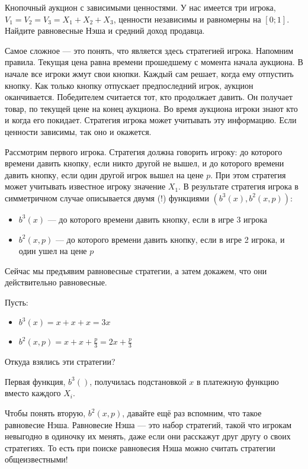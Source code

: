 \begin{myex} Кнопочный аукцион с зависимыми ценностями.
У нас имеется три игрока, $ V_{1}=V_{2}=V_{3}=X_{1}+X_{2}+X_{3} $, ценности независимы и равномерны на $ [0;1] $. Найдите равновесные Нэша и средний доход продавца.

Самое сложное — это понять, что является здесь стратегией игрока. Напомним правила. Текущая цена равна времени прошедшему с момента начала аукциона. В начале все игроки жмут свои кнопки. Каждый сам решает, когда ему отпустить кнопку. Как только кнопку отпускает предпоследний игрок, аукцион оканчивается. Победителем считается тот, кто продолжает давить. Он получает товар, по текущей цене на конец аукциона. Во время аукциона игроки знают кто и когда его покидает. Стратегия игрока может учитывать эту информацию. Если ценности зависимы, так оно и окажется.

Рассмотрим первого игрока. Стратегия должна говорить игроку: до которого времени давить кнопку, если никто другой не вышел, и до которого времени давить кнопку, если один другой игрок вышел на цене $ p $. При этом стратегия может учитывать известное игроку значение $ X_{1} $. В результате стратегия игрока в симметричном случае описывается двумя (!) функциями $ (b^{3}(x), b^{2}(x,p)) $:
\begin{itemize}
\item $ b^{3}(x) $ — до которого времени давить кнопку, если в игре 3 игрока
\item $ b^{2}(x,p) $ — до которого времени давить кнопку, если в игре 2 игрока, и один ушел на цене $ p $
\end{itemize}


Сейчас мы предъявим равновесные стратегии, а затем докажем, что они действительно равновесные.

Пусть:
\begin{itemize}
\item $ b^{3}(x)=x+x+x=3x$
\item $ b^{2}(x,p)=x+x+\frac{p}{3}=2x+\frac{p}{3}$
\end{itemize}

Откуда взялись эти стратегии?


Первая функция, $ b^{3}() $, получилась подстановкой $ x $ в платежную функцию вместо каждого $ X_{i} $.

Чтобы понять вторую, $ b^{2}(x,p) $, давайте ещё раз вспомним, что такое равновесие Нэша.  Равновесие Нэша — это набор стратегий, такой что игрокам невыгодно в одиночку их менять, даже если они расскажут друг другу о своих стратегиях. То есть при поиске равновесия Нэша можно считать стратегии общеизвестными!


\end{myex}
